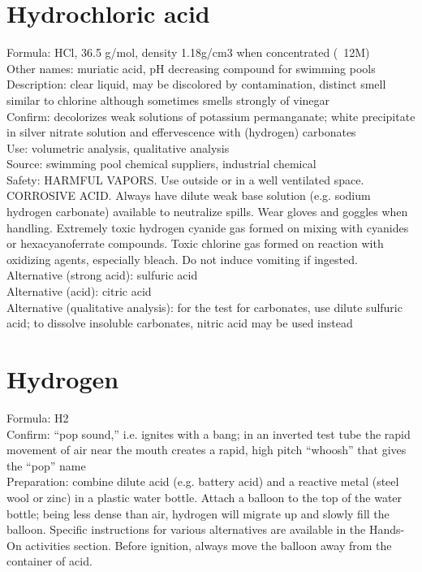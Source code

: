 \section{Hydrochloric acid}
Formula: HCl, 
36.5 g/mol, 
density 1.18g/cm3 when concentrated (~12M)\\
Other names: muriatic acid, 
pH decreasing compound for swimming pools\\
Description: clear liquid, 
may be discolored by contamination, 
distinct smell similar to chlorine 
although sometimes smells strongly of vinegar\\
Confirm: decolorizes weak solutions of potassium permanganate; 
white precipitate in silver nitrate solution 
and effervescence with (hydrogen) carbonates\\
Use: volumetric analysis, 
qualitative analysis\\
Source: swimming pool chemical suppliers, industrial chemical\\ 
Safety: HARMFUL VAPORS. 
Use outside or in a well ventilated space. 
CORROSIVE ACID. 
Always have dilute weak base solution (e.g. 
sodium hydrogen carbonate) available to neutralize spills. 
Wear gloves and goggles when handling. 
Extremely toxic hydrogen cyanide gas formed 
on mixing with cyanides or hexacyanoferrate compounds. 
Toxic chlorine gas formed on reaction with oxidizing agents, 
especially bleach. 
Do not induce vomiting if ingested.\\
Alternative (strong acid): sulfuric acid\\
Alternative (acid): citric acid\\
Alternative (qualitative analysis): for the test for carbonates, 
use dilute sulfuric acid; 
to dissolve insoluble carbonates, 
nitric acid may be used instead

\section{Hydrogen}
Formula: H2\\
Confirm: “pop sound,” i.e. 
ignites with a bang; 
in an inverted test tube the rapid movement of air 
near the mouth creates a rapid, 
high pitch “whoosh” that gives the “pop” name\\
Preparation: combine dilute acid (e.g. 
battery acid) and a reactive metal (steel wool or zinc) 
in a plastic water bottle. 
Attach a balloon to the top of the water bottle; 
being less dense than air, 
hydrogen will migrate up and slowly fill the balloon. 
Specific instructions for various alternatives are available 
in the Hands-On activities section. 
Before ignition, 
always move the balloon away from the container of acid.

